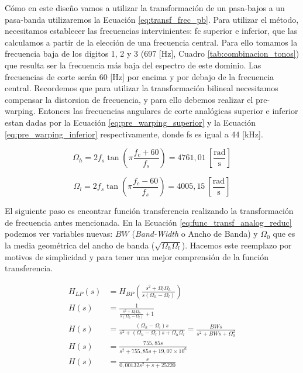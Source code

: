 Cómo en este diseño vamos a utilizar la transformación de un pasa-bajos a un pasa-banda utilizaremos la Ecuación \ref{eq:transf_frec_pb}. Para utilizar el método, necesitamos establecer las frecuencias intervinientes: \gls{fc} superior e inferior, que las calculamos a partir de la elección de una frecuencia central. Para ello tomamos la frecuencia baja de los digitos 1, 2 y 3 (697 [Hz], Cuadro \ref{tab:combinacion_tonos}) que resulta ser la frecuencia más baja del espectro de este dominio. Las frecuencias de corte serán 60 [Hz] por encima y por debajo de la frecuencia central. Recordemos que para utilizar la transformación bilineal necesitamos compensar la distorsion de frecuencia, y para ello debemos realizar el pre-warping. Entonces las frecuencias angulares de corte analógicas superior e inferior estan dadas por la Ecuación \ref{eq:pre_warping_superior} y la Ecuación \ref{eq:pre_warping_inferior} respectivamente, donde \gls{fs} es igual a 44 [kHz].

\begin{equation}
  \Omega_h = 2 f_s \tan \left(\pi\frac{f_c+60}{f_s}\right) = 4761,01\ \mathrm{\left[\frac{rad}{s}\right]}
  \label{eq:pre_warping_superior}
\end{equation}

\begin{equation}
  \Omega_l = 2 f_s \tan \left(\pi\frac{f_c-60}{f_s}\right) = 4005,15\ \mathrm{\left[\frac{rad}{s}\right]}
  \label{eq:pre_warping_inferior}
\end{equation}

El siguiente paso es encontrar función transferencia realizando la transformación de frecuencia antes mencionada. En la Ecuación \ref{eq:func_transf_analog_reduc} podemos ver variables nuevas: $BW$ (\textit{Band-Width} o Ancho de Banda) y $\Omega_0$ que es la media geométrica del ancho de banda ($\sqrt{\Omega_h\Omega_l}$). Hacemos este reemplazo por motivos de simplicidad y para tener una mejor comprensión de la función transferencia.

\begin{align}
  H_{LP}(s) & = H_{BP}\left(\frac{s^2 + \Omega_l \Omega_h}{s(\Omega_h - \Omega_l)}\right)                                                                                  \\
  H(s)      & = \frac{1}{\frac{s^2 + \Omega_l \Omega_h}{s(\Omega_h - \Omega_l)}+1}                                                                                         \\
  H(s)      & = \frac{(\Omega_h - \Omega_l)s}{s^2 + (\Omega_h - \Omega_l)s + \Omega_h \Omega_l} = \frac{BW s}{s^2 + BW s + \Omega_0^2} \label{eq:func_transf_analog_reduc} \\
  H(s)      & = \frac{755,85 s}{s^2 + 755,85s + 19,07 \times 10^6}                                                                                                         \\
  H(s)      & = \frac{s}{0,00132s^2 + s + 25220}
\end{align}

